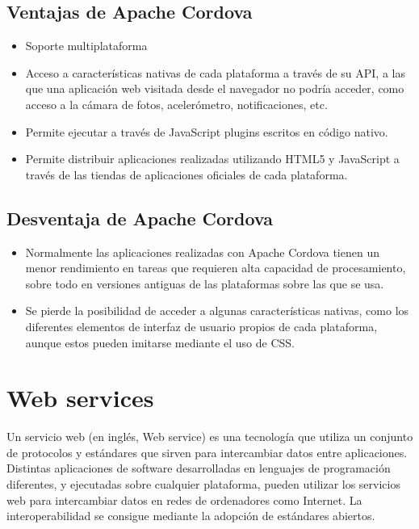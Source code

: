 \subsection{Ventajas de Apache Cordova}

\begin{itemize}

    \item Soporte multiplataforma
    
    \item Acceso a características nativas de cada plataforma a través de su API, a las que una aplicación web visitada desde el navegador no podría acceder, como acceso a la cámara de fotos, acelerómetro, notificaciones, etc.
    
    \item Permite ejecutar a través de JavaScript plugins escritos en código nativo.
    
    \item Permite distribuir aplicaciones realizadas utilizando HTML5 y JavaScript a través de las tiendas de aplicaciones oficiales de cada plataforma.
    
    \end{itemize}
    \subsection{Desventaja de Apache Cordova}
    \begin{itemize}
\item Normalmente las aplicaciones realizadas con Apache Cordova tienen un menor rendimiento en tareas que requieren alta capacidad de procesamiento, sobre todo en versiones antiguas de las plataformas sobre las que se usa.

\item Se pierde la posibilidad de acceder a algunas características nativas, como los diferentes elementos de interfaz de usuario propios de cada plataforma, aunque estos pueden imitarse mediante el uso de CSS.
\end{itemize}

\section{Web services}
\label{sec:webservices}

Un servicio web (en inglés, Web service) es una tecnología que utiliza un conjunto de protocolos y estándares que sirven para intercambiar datos entre aplicaciones. Distintas aplicaciones de software desarrolladas en lenguajes de programación diferentes, y ejecutadas sobre cualquier plataforma, pueden utilizar los servicios web para intercambiar datos en redes de ordenadores como Internet. La interoperabilidad se consigue mediante la adopción de estándares abiertos.

